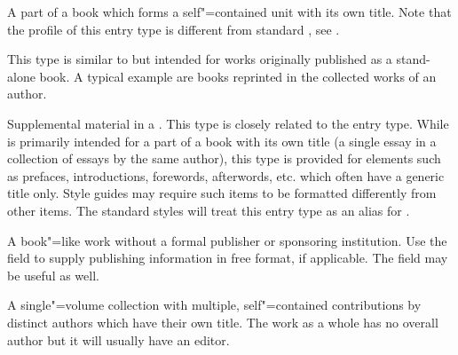 \documentclass{ltxdockit}[2011/03/25]
\begin{document}
\begin{typelist}
A part of a book which forms a self"=contained unit with its own title. Note that the profile of this entry type is different from standard \bibtex, see .



This type is similar to  but intended for works originally published as a stand-alone book. A typical example are books reprinted in the collected works of an author.


Supplemental material in a . This type is closely related to the  entry type. While  is primarily intended for a part of a book with its own title (\eg a single essay in a collection of essays by the same author), this type is provided for elements such as prefaces, introductions, forewords, afterwords, etc. which often have a generic title only. Style guides may require such items to be formatted differently from other  items. The standard styles will treat this entry type as an alias for .


A book"=like work without a formal publisher or sponsoring institution. Use the field  to supply publishing information in free format, if applicable. The field  may be useful as well.



A single"=volume collection with multiple, self"=contained contributions by distinct authors which have their own title. The work as a whole has no overall author but it will usually have an editor.



\end{typelist}
\end{document}
